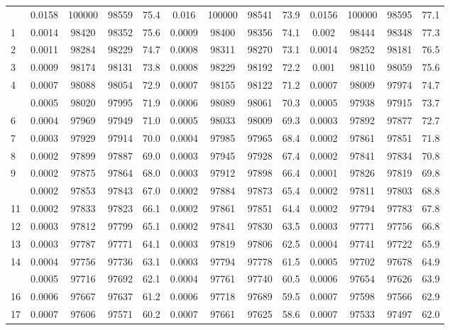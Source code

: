 \documentclass[
  14pt,
]{article}
\begin{document}
\begin{longtable}[t]{lcccccccccccc}
\endfoot
\bottomrule
\endlastfoot
0 & 0.0158 & 100000 & 98559 & 75.4 & 0.016 & 100000 & 98541 & 73.9 & 0.0156 & 100000 & 98595 & 77.1\\
1 & 0.0014 & 98420 & 98352 & 75.6 & 0.0009 & 98400 & 98356 & 74.1 & 0.002 & 98444 & 98348 & 77.3\\
2 & 0.0011 & 98284 & 98229 & 74.7 & 0.0008 & 98311 & 98270 & 73.1 & 0.0014 & 98252 & 98181 & 76.5\\
3 & 0.0009 & 98174 & 98131 & 73.8 & 0.0008 & 98229 & 98192 & 72.2 & 0.001 & 98110 & 98059 & 75.6\\
4 & 0.0007 & 98088 & 98054 & 72.9 & 0.0007 & 98155 & 98122 & 71.2 & 0.0007 & 98009 & 97974 & 74.7\\
\addlinespace
5 & 0.0005 & 98020 & 97995 & 71.9 & 0.0006 & 98089 & 98061 & 70.3 & 0.0005 & 97938 & 97915 & 73.7\\
6 & 0.0004 & 97969 & 97949 & 71.0 & 0.0005 & 98033 & 98009 & 69.3 & 0.0003 & 97892 & 97877 & 72.7\\
7 & 0.0003 & 97929 & 97914 & 70.0 & 0.0004 & 97985 & 97965 & 68.4 & 0.0002 & 97861 & 97851 & 71.8\\
8 & 0.0002 & 97899 & 97887 & 69.0 & 0.0003 & 97945 & 97928 & 67.4 & 0.0002 & 97841 & 97834 & 70.8\\
9 & 0.0002 & 97875 & 97864 & 68.0 & 0.0003 & 97912 & 97898 & 66.4 & 0.0001 & 97826 & 97819 & 69.8\\
\addlinespace
10 & 0.0002 & 97853 & 97843 & 67.0 & 0.0002 & 97884 & 97873 & 65.4 & 0.0002 & 97811 & 97803 & 68.8\\
11 & 0.0002 & 97833 & 97823 & 66.1 & 0.0002 & 97861 & 97851 & 64.4 & 0.0002 & 97794 & 97783 & 67.8\\
12 & 0.0003 & 97812 & 97799 & 65.1 & 0.0002 & 97841 & 97830 & 63.5 & 0.0003 & 97771 & 97756 & 66.8\\
13 & 0.0003 & 97787 & 97771 & 64.1 & 0.0003 & 97819 & 97806 & 62.5 & 0.0004 & 97741 & 97722 & 65.9\\
14 & 0.0004 & 97756 & 97736 & 63.1 & 0.0003 & 97794 & 97778 & 61.5 & 0.0005 & 97702 & 97678 & 64.9\\
\addlinespace
15 & 0.0005 & 97716 & 97692 & 62.1 & 0.0004 & 97761 & 97740 & 60.5 & 0.0006 & 97654 & 97626 & 63.9\\
16 & 0.0006 & 97667 & 97637 & 61.2 & 0.0006 & 97718 & 97689 & 59.5 & 0.0007 & 97598 & 97566 & 62.9\\
17 & 0.0007 & 97606 & 97571 & 60.2 & 0.0007 & 97661 & 97625 & 58.6 & 0.0007 & 97533 & 97497 & 62.0\\

\end{longtable}
\end{document}
